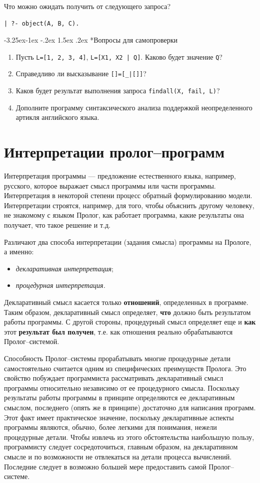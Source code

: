 \documentclass[12pt, openany, twoside]{book} %
\makeatletter
\renewcommand\subsubsection{\@startsection{subsubsection}{3}{\z@}%
                                     {-3.25ex\@plus -1ex \@minus -.2ex}%
                                     {1.5ex \@plus .2ex}%
                                     {\normalfont\normalsize\bfseries}}
\newenvironment{questions}{\subsubsection*{Вопросы для самопроверки}\begin{enumerate}}{\end{enumerate}}
\makeatother
\begin{document}
Что можно ожидать получить от следующего запроса?
{\tt\begin{verbatim}
| ?- object(А, В, С).
\end{verbatim}}
\begin{questions}
\item{} Пусть \texttt{L=[1, 2, 3, 4]}, \texttt{L=[X1, X2 | Q]}. Каково будет значение \texttt{Q}?
\item{} Справедливо ли высказывание \texttt{[]=[\_|[]]}?
\item{} Каков будет результат выполнения запроса \texttt{findall(X, fail, L)}?
\item{} Дополните программу синтаксического анализа поддержкой неопределенного артикля английского языка.
\end{questions}

\chapter{Интерпретации пролог--программ}
Интерпретация программы --- предложение естественного языка, например, русского, которое выражает смысл программы или части программы. Интерпретация в некоторой степени процесс обратный формулированию модели. Интерпретации строятся, например, для того, чтобы объяснить другому человеку, не знакомому с языком Пролог, как работает программа, какие результаты она получает, что такое решение и т.д.

Различают два способа \cite{Bratko} интерпретации (задания смысла) программы на Прологе, а именно:
\begin{itemize}
\item \emph{декларативная интерпретация};
\item \emph{процедурная интерпретация.}
\end{itemize}


Декларативный смысл касается только \textbf{отношений}, определенных в программе. Таким образом, декларативный смысл определяет, {\bf что} должно быть результатом работы программы. С другой стороны, процедурный смысл определяет еще и {\bf как} этот {\bf результат был получен}, т.е. как отношения реально обрабатываются Пролог--системой.

Способность Пролог--системы прорабатывать многие процедурные детали самостоятельно считается одним из специфических преимуществ Пролога. Это свойство побуждает программиста рассматривать декларативный смысл программы относительно независимо от ее процедурного смысла. Поскольку результаты работы программы в принципе определяются ее декларативным смыслом, последнего (опять же в принципе) достаточно для написания программ. Этот факт имеет практическое значение, поскольку декларативные аспекты программы являются, обычно, более легкими для понимания, нежели процедурные детали. Чтобы извлечь из этого обстоятельства наибольшую пользу, программисту следует сосредоточиться, главным образом, на декларативном смысле и по возможности не отвлекаться на детали процесса вычислений. Последние следует в возможно большей мере предоставить самой Пролог--системе.
\end{document}
